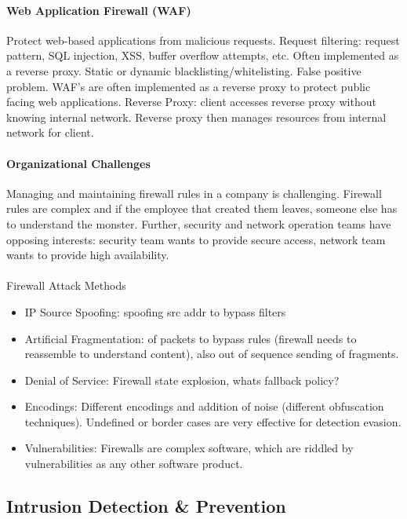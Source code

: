 \paragraph{Web Application Firewall (WAF)}

Protect web-based applications from malicious requests. Request filtering: request pattern, SQL injection, XSS, buffer overflow attempts, etc. Often implemented as a reverse proxy. Static or dynamic blacklisting/whitelisting. False positive problem. WAF's are often implemented as a reverse proxy to protect public facing web applications. Reverse Proxy: client accesses reverse proxy without knowing internal network. Reverse proxy then manages resources from internal network for client.

\paragraph{Organizational Challenges}

Managing and maintaining firewall rules in a company is challenging. Firewall rules are complex and if the employee that created them leaves, someone else has to understand the monster. Further, security and network operation teams have opposing interests: security team wants to provide secure access, network team wants to provide high availability.

\paragraph{}{Firewall Attack Methods}
\begin{itemize}
    \item IP Source Spoofing: spoofing src addr to bypass filters
    \item Artificial Fragmentation: of packets to bypass rules (firewall needs to reassemble to understand content), also out of sequence sending of fragments.
    \item Denial of Service: Firewall state explosion, whats fallback policy?
    \item Encodings: Different encodings and addition of noise (different obfuscation techniques). Undefined or border cases are very effective for detection evasion.
    \item Vulnerabilities: Firewalls are complex software, which are riddled by vulnerabilities as any other software product.
\end{itemize}

\subsection{Intrusion Detection \& Prevention}

